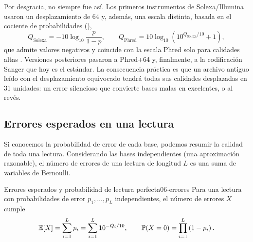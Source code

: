 Por desgracia, no siempre fue así. Los primeros instrumentos de Solexa/Illumina usaron un desplazamiento de 64 y, además, una escala distinta, basada en el cociente de probabilidades (),
\begin{equation}\label{eq:06-solexa}
Q_{\text{Solexa}} = -10\log_{10}\frac{p}{1-p},\qquad Q_{\text{Phred}} = 10\log_{10}\!\left(10^{Q_{\text{Solexa}}/10}+1\right),
\end{equation}
que admite valores negativos y coincide con la escala Phred solo para calidades altas \parencite{c06-cock2010}. Versiones posteriores pasaron a Phred+64 y, finalmente, a la codificación Sanger que hoy es el estándar. La consecuencia práctica es que un archivo antiguo leído con el desplazamiento equivocado tendrá todas sus calidades desplazadas en 31 unidades: un error silencioso que convierte bases malas en excelentes, o al revés.

\begin{simbolos}
\end{simbolos}

\subsection{Errores esperados en una lectura}

Si conocemos la probabilidad de error de cada base, podemos resumir la calidad de toda una lectura. Considerando las bases independientes (una aproximación razonable), el número de errores de una lectura de longitud $L$ es una suma de variables de Bernoulli.

\begin{teorema}{Errores esperados y probabilidad de lectura perfecta}{06-errores}
Para una lectura con probabilidades de error $p_1,\dots,p_L$ independientes, el número de errores $X$ cumple
\begin{equation}\label{eq:06-errores}
\mathbb{E}[X] = \sum_{i=1}^{L} p_i = \sum_{i=1}^{L}10^{-Q_i/10},\qquad
\mathbb{P}(X=0) = \prod_{i=1}^{L}\left(1-p_i\right).
\end{equation}
\end{teorema}

\begin{simbolos}
\end{simbolos}

